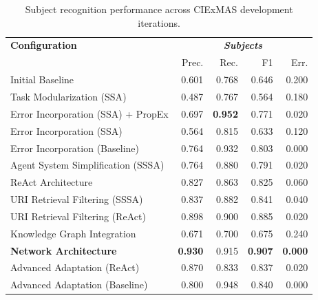 \documentclass[a4paper,oneside,bibliography=totoc]{scrbook}
\begin{document}
\begin{table}[h]
  \centering
  \begin{tabular}{p{6cm}|rrrr}
    \toprule
    \textbf{Configuration}                       & \multicolumn{4}{c}{\textit{\textbf{Subjects}}}                                                    \\
                                                 & Prec.                                          & Rec.           & F1             & Err.           \\
    \midrule
    Initial Baseline                             & 0.601                                          & 0.768          & 0.646          & 0.200          \\
    Task Modularization (\ac{SSA})               & 0.487                                          & 0.767          & 0.564          & 0.180          \\
    Error Incorporation (\ac{SSA}) + \ac{PropEx} & 0.697                                          & \textbf{0.952} & 0.771          & 0.020          \\
    Error Incorporation (\ac{SSA})               & 0.564                                          & 0.815          & 0.633          & 0.120          \\
    Error Incorporation (Baseline)               & 0.764                                          & 0.932          & 0.803          & 0.000          \\
    Agent System Simplification (\ac{SSSA})      & 0.764                                          & 0.880          & 0.791          & 0.020          \\
    \ac{ReAct} Architecture                      & 0.827                                          & 0.863          & 0.825          & 0.060          \\
    \ac{URI} Retrieval Filtering (\ac{SSSA})     & 0.837                                          & 0.882          & 0.841          & 0.040          \\
    \ac{URI} Retrieval Filtering (\ac{ReAct})    & 0.898                                          & 0.900          & 0.885          & 0.020          \\
    Knowledge Graph Integration                  & 0.671                                          & 0.700          & 0.675          & 0.240          \\
    \textbf{Network Architecture}                & \textbf{0.930}                                 & 0.915          & \textbf{0.907} & \textbf{0.000} \\
    Advanced Adaptation (\ac{ReAct})             & 0.870                                          & 0.833          & 0.837          & 0.020          \\
    Advanced Adaptation (Baseline)               & 0.800                                          & 0.948          & 0.840          & 0.000          \\
    \bottomrule
  \end{tabular}
  \caption{Subject recognition performance across CIExMAS development iterations.}
  \label{tab:evaluation_subjects_iterations}
\end{table}
\end{document}
